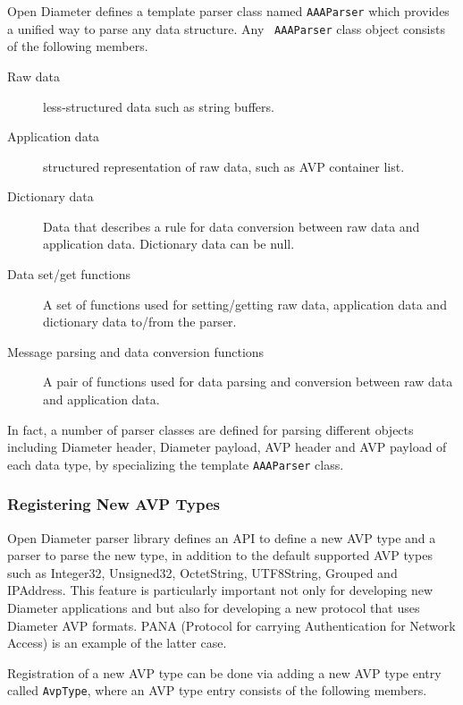 \documentclass{article}
\begin{document}
Open Diameter defines a template parser class named {\tt AAAParser}
which provides a unified way to parse any data structure.  Any {\tt
AAAParser} class object consists of the following members.

\begin{description}
 \item[Raw data] less-structured data such as string buffers.
 \item[Application data] structured representation of raw data, such as
	    AVP container list.
 \item[Dictionary data] Data that describes a rule for data conversion
 between raw data and application data.  Dictionary data can be null.
 \item[Data set/get functions] A set of functions used for
 setting/getting raw data, application data and dictionary data to/from
 the parser.
 \item[Message parsing and data conversion functions] A pair of
 functions used for data parsing and conversion between raw data and
 application data.
\end{description}

In fact, a number of parser classes are defined for parsing different
objects including Diameter header, Diameter payload, AVP header and AVP
payload of each data type, by specializing the template {\tt AAAParser}
class.

\subsubsection{Registering New AVP Types\label{sec:avpparsing}}

Open Diameter parser library defines an API to define a new AVP type and
a parser to parse the new type, in addition to the default supported AVP
types such as Integer32, Unsigned32, OctetString, UTF8String, Grouped
and IPAddress.  This feature is particularly important not only for
developing new Diameter applications and but also for developing a new
protocol that uses Diameter AVP formats.  PANA (Protocol for carrying
Authentication for Network Access) is an example of the latter case.

Registration of a new AVP type can be done via adding a new AVP type
entry called {\tt AvpType}, where an AVP type entry consists of the
following members.
\end{document}
